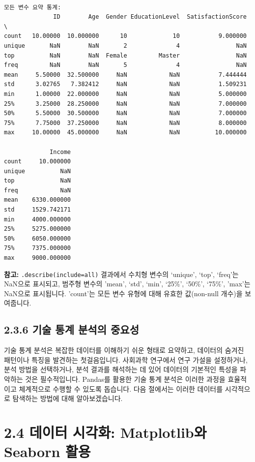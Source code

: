 \documentclass[
  letterpaper,
]{book}
\begin{document}
\begin{verbatim}

모든 변수 요약 통계:
              ID        Age  Gender EducationLevel  SatisfactionScore  \
count   10.00000  10.000000      10             10           9.000000   
unique       NaN        NaN       2              4                NaN   
top          NaN        NaN  Female         Master                NaN   
freq         NaN        NaN       5              4                NaN   
mean     5.50000  32.500000     NaN            NaN           7.444444   
std      3.02765   7.382412     NaN            NaN           1.509231   
min      1.00000  22.000000     NaN            NaN           5.000000   
25%      3.25000  28.250000     NaN            NaN           7.000000   
50%      5.50000  30.500000     NaN            NaN           7.000000   
75%      7.75000  37.250000     NaN            NaN           8.000000   
max     10.00000  45.000000     NaN            NaN          10.000000   

             Income  
count     10.000000  
unique          NaN  
top             NaN  
freq            NaN  
mean    6330.000000  
std     1529.742171  
min     4000.000000  
25%     5275.000000  
50%     6050.000000  
75%     7375.000000  
max     9000.000000  
\end{verbatim}

\textbf{참고:}
\texttt{.describe(include=\textquotesingle{}all\textquotesingle{})}
결과에서 수치형 변수의 `unique', `top', `freq'는 NaN으로 표시되고,
범주형 변수의 'mean', `std', `min', `25\%', `50\%', `75\%', 'max'는
NaN으로 표시됩니다. 'count'는 모든 변수 유형에 대해 유효한 값(non-null
개수)을 보여줍니다.

\subsection{2.3.6 기술 통계 분석의
중요성}\label{uxae30uxc220-uxd1b5uxacc4-uxbd84uxc11duxc758-uxc911uxc694uxc131}

기술 통계 분석은 복잡한 데이터를 이해하기 쉬운 형태로 요약하고, 데이터의
숨겨진 패턴이나 특징을 발견하는 첫걸음입니다. 사회과학 연구에서 연구
가설을 설정하거나, 분석 방법을 선택하거나, 분석 결과를 해석하는 데 있어
데이터의 기본적인 특성을 파악하는 것은 필수적입니다. Pandas를 활용한
기술 통계 분석은 이러한 과정을 효율적이고 체계적으로 수행할 수 있도록
돕습니다. 다음 절에서는 이러한 데이터를 시각적으로 탐색하는 방법에 대해
알아보겠습니다.

\section{2.4 데이터 시각화: Matplotlib와 Seaborn
활용}\label{sec-visualization}
\end{document}
